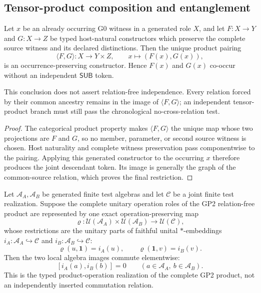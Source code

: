 \documentclass[12pt,a4paper]{article}
\begin{document}
\subsection{Tensor-product composition and entanglement}
\label{p4:sec:part1-entanglement}


\begin{proposition}
\label{p4:prop:common-witness-cooccurrence}
Let \(x\) be an already occurring G0 witness in a generated role \(X\), and
let \(F:X\to Y\) and \(G:X\to Z\) be typed host-natural constructors which
preserve the complete source witness and its declared distinctions.  Then the
unique product pairing
\[
 \langle F,G\rangle:X\longrightarrow Y\times Z,
 \qquad
 x\longmapsto(F(x),G(x)),
\]
is an occurrence-preserving constructor.  Hence \(F(x)\) and \(G(x)\)
co-occur without an independent \(\mathsf{SUB}\) token.

This conclusion does not assert relation-free independence.  Every relation
forced by their common ancestry remains in the image of
\(\langle F,G\rangle\); an independent tensor-product branch must still pass
the chronological no-cross-relation test.
\end{proposition}

\begin{proof}
The categorical product property makes \(\langle F,G\rangle\) the unique map
whose two projections are \(F\) and \(G\), so no member, parameter, or second
source witness is chosen.  Host naturality and complete witness preservation
pass componentwise to the pairing.  Applying this generated constructor to
the occurring \(x\) therefore produces the joint descendant token.  Its image
is generally the graph of the common-source relation, which proves the final
restriction.
\end{proof}


\begin{theorem}
\label{p4:thm:gp2-product-operation-interchange}
Let \(\mathcal A_A,\mathcal A_B\) be generated finite test algebras and let
\(\mathcal C\) be a joint finite test realization.  Suppose the complete
unitary operation roles of the GP2 relation-free product are represented by
one exact operation-preserving map
\[
 \varrho:
 \mathcal U(\mathcal A_A)\times\mathcal U(\mathcal A_B)
 \longrightarrow \mathcal U(\mathcal C),
\]
whose restrictions are the unitary parts of faithful unital
\(*\)-embeddings \(i_A:\mathcal A_A\hookrightarrow\mathcal C\) and
\(i_B:\mathcal A_B\hookrightarrow\mathcal C\):
\[
 \varrho(u,\mathbf1)=i_A(u),
 \qquad
 \varrho(\mathbf1,v)=i_B(v).
\]
Then the two local algebra images commute elementwise:
\[
 \boxed{[i_A(a),i_B(b)]=0
 \qquad(a\in\mathcal A_A,\ b\in\mathcal A_B).}
\]
This is the typed product-operation realization of the complete GP2 product,
not an independently inserted commutation relation.
\end{theorem}
\end{document}
